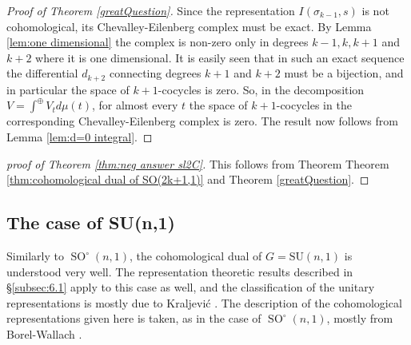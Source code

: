 \documentclass[12pt,reqno]{amsart}
\theoremstyle{definition}
\newcommand{\SO}{\operatorname{SO}}
\begin{document}
\begin{proof}[Proof of Theorem \ref{greatQuestion}]
    Since the representation $I(\sigma_{k-1},s)$ is not cohomological, its Chevalley-Eilenberg complex must be exact. By Lemma \ref{lem:one dimensional} the complex is non-zero only in degrees $k-1,k,k+1$ and $k+2$ where it is one dimensional. It is easily seen that in such an exact sequence the differential $d_{k+2}$ connecting degrees $k+1$ and $k+2$ must be a bijection, and in particular the space of $k+1$-cocycles is zero. So, in the decomposition $V=\int^\oplus V_t d\mu(t)$, for almost every $t$ the space of $k+1$-cocycles in the corresponding Chevalley-Eilenberg complex is zero. The result now follows from Lemma \ref{lem:d=0 integral}.
\end{proof}
\begin{proof}[proof of Theorem \ref{thm:neg answer sl2C}]
    This follows from Theorem Theorem \ref{thm:cohomological dual of SO(2k+1,1)} and Theorem \ref{greatQuestion}.
\end{proof}
\subsection{The case of SU(n,1)}
Similarly to $\SO^\circ(n,1)$, the cohomological dual of $G=\mathrm{SU}(n,1)$ is understood very well. The representation theoretic results described in \S\ref{subsec:6.1} apply to this case as well, and the classification of the unitary representations is mostly due to Kraljevi\'c \cite{Krlajevic}. The description of the cohomological representations given here is taken, as in the case of $\SO^\circ(n,1)$, mostly from Borel-Wallach \cite[Section~VI.3-VI.4]{BorelWallach}.
\end{document}
